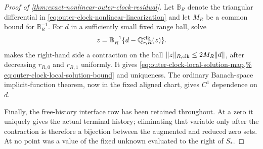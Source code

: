 \begin{proof}[Proof of
\cref{thm:exact-nonlinear-outer-clock-residual}]
Let \(\mathbb B_R\) denote the triangular differential in
\cref{eq:outer-clock-nonlinear-linearization} and let \(M_R\) be a common
bound for \(\mathbb B_R^{-1}\).  For \(d\) in a sufficiently small fixed
range ball, solve
\begin{equation}
 z=\mathbb B_R^{-1}
       \{d-\mathbb Q_{r,R}^{\rm clk}(z)\}.       \label{eq:proof-outer-clock-rhs-contraction}
\end{equation}
 makes the right-hand
side a contraction on the ball
\(\|z\|_{R,\rm clk}\le2M_R\|d\|\), after decreasing
\(r_{R,0}\) and \(r_{R,1}\) uniformly.  It gives
\cref{eq:outer-clock-local-solution-map,%
eq:outer-clock-local-solution-bound} and uniqueness.  The ordinary
Banach-space implicit-function theorem, now in the fixed aligned chart,
gives \(C^1\) dependence on \(d\).

Finally, the free-history interface row has been retained throughout.
At a zero it uniquely gives the actual terminal history; eliminating that
variable only after the contraction is therefore a bijection between the
augmented and reduced zero sets.  At no point was a value of the fixed
unknown evaluated to the right of \(S_*\).
\end{proof}

